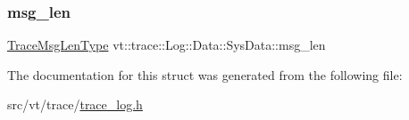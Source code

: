 \mbox{\label{structvt_1_1trace_1_1_log_1_1_data_1_1_sys_data_a514d2e0977e4acf99920ed45a910ae0a}} 
\subsubsection{\texorpdfstring{msg\+\_\+len}{msg\_len}}
{\footnotesize\ttfamily \hyperlink{namespacevt_1_1trace_aeb598f45d67d41db7902e494f2f0ce59}{Trace\+Msg\+Len\+Type} vt\+::trace\+::\+Log\+::\+Data\+::\+Sys\+Data\+::msg\+\_\+len}



The documentation for this struct was generated from the following file\+:\begin{DoxyCompactItemize}
\item 
src/vt/trace/\hyperlink{trace__log_8h}{trace\+\_\+log.\+h}\end{DoxyCompactItemize}
